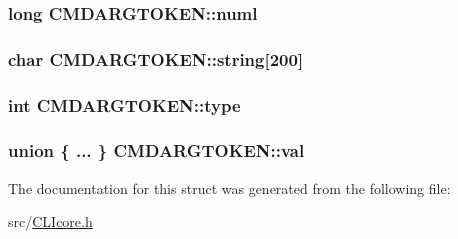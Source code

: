 \subsubsection[{numl}]{\setlength{\rightskip}{0pt plus 5cm}long C\+M\+D\+A\+R\+G\+T\+O\+K\+E\+N\+::numl}\label{structCMDARGTOKEN_a8ef8bd8dde032f117c7c316dee08a7c9}
\hypertarget{structCMDARGTOKEN_ac74ef24422dc07823178ebbe43b7ad10}{}
\subsubsection[{string}]{\setlength{\rightskip}{0pt plus 5cm}char C\+M\+D\+A\+R\+G\+T\+O\+K\+E\+N\+::string\mbox{[}200\mbox{]}}\label{structCMDARGTOKEN_ac74ef24422dc07823178ebbe43b7ad10}
\hypertarget{structCMDARGTOKEN_a268f75c3a394c9466df7aba70dc76c00}{}
\subsubsection[{type}]{\setlength{\rightskip}{0pt plus 5cm}int C\+M\+D\+A\+R\+G\+T\+O\+K\+E\+N\+::type}\label{structCMDARGTOKEN_a268f75c3a394c9466df7aba70dc76c00}
\hypertarget{structCMDARGTOKEN_a96839ddcbefc8d1629d9be94a1319bc3}{}
\subsubsection[{val}]{\setlength{\rightskip}{0pt plus 5cm}union \{ ... \}   C\+M\+D\+A\+R\+G\+T\+O\+K\+E\+N\+::val}\label{structCMDARGTOKEN_a96839ddcbefc8d1629d9be94a1319bc3}


The documentation for this struct was generated from the following file\+:\begin{DoxyCompactItemize}
\item 
src/\hyperlink{CLIcore_8h}{C\+L\+Icore.\+h}\end{DoxyCompactItemize}
